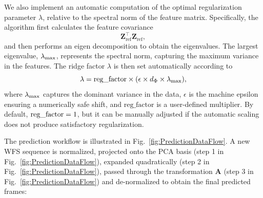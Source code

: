 We also implement an automatic computation of the optimal regularization parameter $\lambda$, relative to the spectral norm of the feature matrix. Specifically, the algorithm first calculates the feature covariance
\begin{equation}
    \mathbf{Z}_{\mathrm{ref}}^\top \mathbf{Z}_{\mathrm{ref}},
\end{equation}
and then performs an eigen decomposition to obtain the eigenvalues. 
The largest eigenvalue, $\lambda_{\rm max}$, represents the spectral norm, capturing the maximum variance in the features. The ridge factor $\lambda$ is then set automatically according to
\begin{equation}
    \lambda = \text{reg\_factor} \times (\epsilon \times d_\Phi \times \lambda_{\rm max}),
\end{equation}
where $\lambda_{\rm max}$ captures the dominant variance in the data, $\epsilon$ is the machine epsilon ensuring a numerically safe shift, and $\text{reg\_factor}$ is a user-defined multiplier. By default, 
${\rm reg\_factor}=1$, but it can be manually adjusted if the automatic scaling does not produce satisfactory regularization.




The prediction workflow is illustrated in Fig.~\ref{fig:PredictionDataFlow}.
A new WFS sequence is normalized, projected onto the PCA basis (step 1 in Fig.~\ref{fig:PredictionDataFlow}), expanded quadratically (step 2 in Fig.~\ref{fig:PredictionDataFlow}), passed through the transformation $\mathbf{A}$ (step 3 in Fig.~\ref{fig:PredictionDataFlow}) and de-normalized to obtain the final predicted frames:

